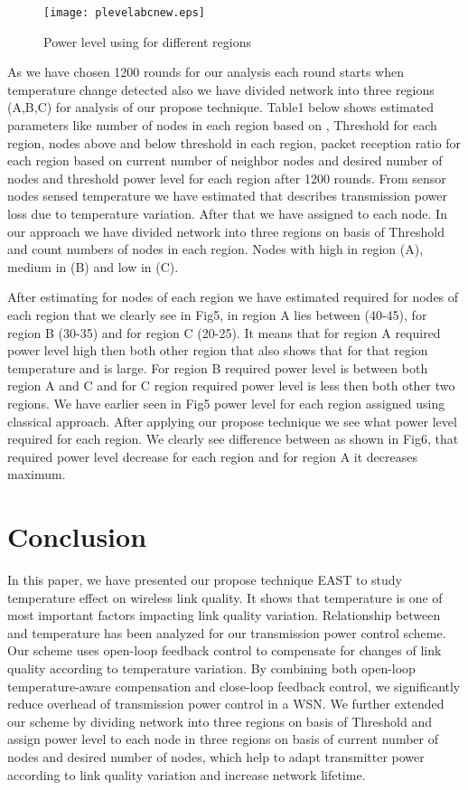 \documentclass{article}
\begin{document}
\begin{figure}[h]
\begin{center}
\texttt{[image: plevelabcnew.eps]}
\vspace{-0.5cm}
\caption{Power level using  for different regions}
\end{center}
\end{figure}

As we have chosen 1200 rounds for our analysis each round starts when temperature change detected also we have divided network into three regions (A,B,C) for analysis of our propose technique. Table1 below shows estimated parameters like number of nodes in each region based on , Threshold  for each region, nodes above and below threshold in each region, packet reception ratio for each region based on current number of neighbor nodes and desired number of nodes and threshold power level for each region after 1200 rounds. From sensor nodes sensed temperature we have estimated  that describes transmission power loss due to temperature variation. After that we have assigned  to each node. In our approach we have divided network into three regions on basis of Threshold  and count numbers of nodes in each region. Nodes with high  in region (A), medium  in (B) and low  in (C).


After estimating  for nodes of each region we have estimated required  for nodes of each region that we clearly see in Fig5, in region A  lies between (40-45), for region B (30-35)  and for region C (20-25). It means that for region A required power level high then both other region that also shows that for that region temperature and  is large. For region B required power level is between both region A and C and for C region required power level is less then both other two regions. We have earlier seen in Fig5 power level for each region assigned using classical approach. After applying our propose technique we see what power level required for each region. We clearly see difference  between  as shown in Fig6, that required power level decrease for each region and for region A it decreases maximum.

\section{Conclusion}
\label{sec:majhead}

In this paper, we have presented  our propose technique  EAST to study temperature effect on wireless link quality. It shows that temperature is one of most important factors impacting link quality variation. Relationship between  and temperature has been analyzed for our transmission power control scheme. Our scheme uses open-loop feedback control to compensate for changes of link quality according to temperature variation. By combining both open-loop temperature-aware compensation and close-loop feedback control, we significantly reduce overhead of transmission power control in a WSN. We  further extended our scheme by dividing network into three regions on basis of Threshold  and assign power level to each node in three regions on basis of current number of nodes and desired number of nodes, which help to adapt transmitter power according to link quality variation and increase network lifetime.
\end{document}
